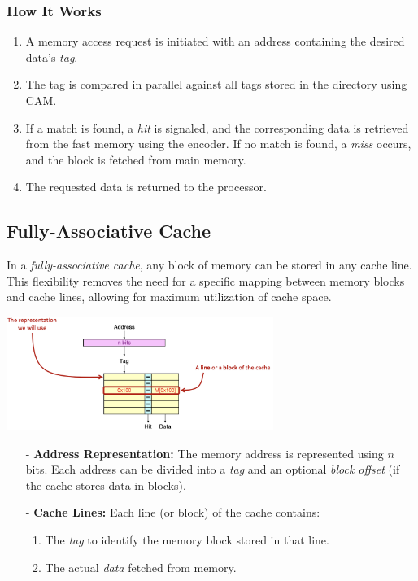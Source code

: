 \subsubsection*{How It Works}
\begin{enumerate}
    \item A memory access request is initiated with an address containing the desired data's \textit{tag}.
    \item The tag is compared in parallel against all tags stored in the directory using CAM.
    \item If a match is found, a \textit{hit} is signaled, and the corresponding data is retrieved from the fast memory using the encoder. If no match is found, a \textit{miss} occurs, and the block is fetched from main memory.
    \item The requested data is returned to the processor.
\end{enumerate}

\subsection{Fully-Associative Cache}

In a \textit{fully-associative cache}, any block of memory can be stored in any cache line. This flexibility removes the need for a specific mapping between memory blocks and cache lines, allowing for maximum utilization of cache space. 

\begin{center}
    \includegraphics[width=0.65\textwidth]{chapters/chapter3a/images/cache4.png}
\end{center}
\begin{itemize}
    \item[-] \textbf{Address Representation:} The memory address is represented using $n$ bits. Each address can be divided into a \textit{tag} and an optional \textit{block offset} (if the cache stores data in blocks).
    \item[-] \textbf{Cache Lines:} Each line (or block) of the cache contains:
    \begin{enumerate}
        \item The \textit{tag} to identify the memory block stored in that line.
        \item The actual \textit{data} fetched from memory.
    \end{enumerate}
\end{itemize}

